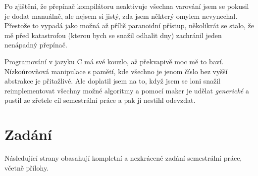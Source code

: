 \documentclass[czech, kiv, he, sem, pdf, viewonly]{fasthesis}
\begin{document}
Po zjištění, že přepínač kompilátoru  neaktivuje všechna varování
jsem se pokusil je dodat manuálně, ale nejsem si jistý, zda jsem některý omylem
nevynechal. Přestože to vypadá jako možná až příliš paranoidní přístup,
několikrát se stalo, že mě před katastrofou (kterou bych se snažil odhalit dny)
zachránil jeden nenápadný přepínač.

Programování v jazyku C má své kouzlo, až překvapivě moc mě to baví.
Nízkoúrovňová manipulace s pamětí, kde všechno je jenom číslo bez vyšší
abstrakce je přitažlivé. Ale doplatil jsem na to, když jsem se loni snažil
reimplementovat všechny možné algoritmy a pomocí maker je udělat
\textit{generické} a pustil ze zřetele cíl semestrální práce a pak ji nestihl
odevzdat.

\appendix

\chapter{Zadání}\label{app:assignment}

Následující strany obasahují kompletní a nezkrácené zadání semestrální práce,
včetně přílohy.

% 


\backmatter

\backpage
\end{document}

